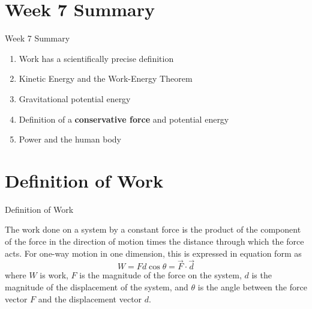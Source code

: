 \documentclass{beamer}
\begin{document}
\section{Week 7 Summary}

\begin{frame}{Week 7 Summary}
\begin{enumerate}
\item \alert{Work} has a scientifically precise definition
\item Kinetic Energy and the \alert{Work-Energy Theorem}
\item Gravitational potential energy
\item Definition of a \textbf{conservative force} and potential energy
\item Power and the human body
\end{enumerate}
\end{frame}

\section{Definition of Work}

\begin{frame}{Definition of Work}
\begin{tcolorbox}[colback=white,colframe=red!40!blue,title=Definition of Work]
\small
\alert{
The work done on a system by a constant force is the product of the component of the force in the direction of motion times the distance through which the force acts.  For one-way motion in one dimension, this is expressed in equation form as 
\begin{equation}
W = Fd\cos\theta = \vec{F} \cdot \vec{d}
\end{equation}
where $W$ is work, $F$ is the magnitude of the force on the system, $d$ is the magnitude of the displacement of the system, and $\theta$ is the angle between the force vector $F$ and the displacement vector $d$.
}
\end{tcolorbox}
\end{frame}
\end{document}
